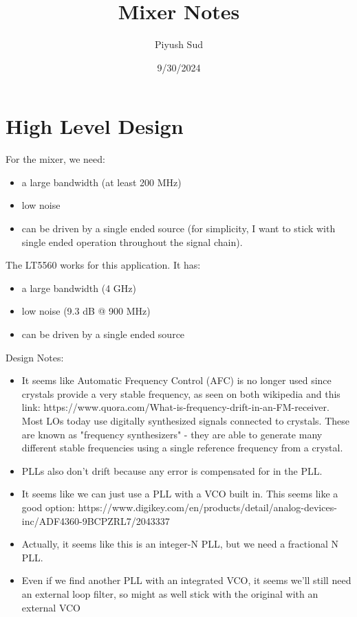 \documentclass[12pt, letterpaper]{article}
\title{Mixer Notes}
\author{Piyush Sud}
\date{9/30/2024}
\begin{document}
\maketitle

\pagebreak

\section{High Level Design}

For the mixer, we need:

\begin{itemize}
    \item a large bandwidth (at least 200 MHz)
    \item low noise
    \item can be driven by a single ended source (for simplicity, I want to stick with single ended operation throughout the signal chain). 
\end{itemize}

\noindent The LT5560 works for this application. It has:

\begin{itemize}
    \item a large bandwidth (4 GHz)
    \item low noise (9.3 dB @ 900 MHz)
    \item can be driven by a single ended source
\end{itemize}


\noindent Design Notes:

\begin{itemize}
    \item It seems like Automatic Frequency Control (AFC) is no longer used since crystals provide a very stable frequency, as seen on both wikipedia and this link: https://www.quora.com/What-is-frequency-drift-in-an-FM-receiver. Most LOs today use digitally synthesized signals connected to crystals. These are known as "frequency synthesizers" - they are able to generate many different stable frequencies using a single reference frequency from a crystal.
    \item PLLs also don't drift because any error is compensated for in the PLL.
    \item It seems like we can just use a PLL with a VCO built in. This seems like a good option: https://www.digikey.com/en/products/detail/analog-devices-inc/ADF4360-9BCPZRL7/2043337
    \item Actually, it seems like this is an integer-N PLL, but we need a fractional N PLL.
    \item Even if we find another PLL with an integrated VCO, it seems we'll still need an external loop filter, so might as well stick with the original with an external VCO
\end{itemize}
\end{document}
